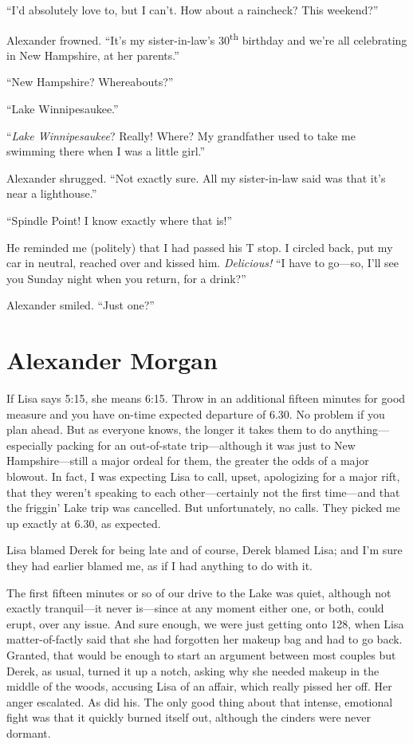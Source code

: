 ``I'd absolutely love to, but I can't. How about a raincheck? This
weekend?''

Alexander frowned. ``It's my sister-in-law's 30\textsuperscript{th}
birthday and we're all celebrating in New Hampshire, at her parents.''

``New Hampshire? Whereabouts?''

``Lake Winnipesaukee.''

``\emph{Lake Winnipesaukee}? Really! Where? My grandfather used to take
me swimming there when I was a little girl.''

Alexander shrugged. ``Not exactly sure. All my sister-in-law said was
that it's near a lighthouse.''

``Spindle Point! I know exactly where that is!''

He reminded me (politely) that I had passed his T stop. I circled back,
put my car in neutral, reached over and kissed him. \emph{Delicious!}
``I have to go---so, I'll see you Sunday night when you return, for a
drink?''

Alexander smiled. ``Just one?''

\chapter{Alexander Morgan}

\titlemark

If Lisa says 5:15, she means 6:15. Throw in an additional fifteen
minutes for good measure and you have on-time expected departure of
6.30. No problem if you plan ahead. But as everyone knows, the longer it
takes them to do anything---especially packing for an out-of-state
trip---although it was just to New Hampshire---still a major ordeal for
them, the greater the odds of a major blowout. In fact, I was expecting
Lisa to call, upset, apologizing for a major rift, that they weren't
speaking to each other---certainly not the first time---and that the
friggin' Lake trip was cancelled. But unfortunately, no calls. They
picked me up exactly at 6.30, as expected.

Lisa blamed Derek for being late and of course, Derek blamed Lisa; and
I'm sure they had earlier blamed me, as if I had anything to do with it.

The first fifteen minutes or so of our drive to the Lake was quiet,
although not exactly tranquil---it never is---since at any moment either
one, or both, could erupt, over any issue. And sure enough, we were just
getting onto 128, when Lisa matter-of-factly said that she had forgotten
her makeup bag and had to go back. Granted, that would be enough to
start an argument between most couples but Derek, as usual, turned it up
a notch, asking why she needed makeup in the middle of the woods,
accusing Lisa of an affair, which really pissed her off. Her anger
escalated. As did his. The only good thing about that intense, emotional
fight was that it quickly burned itself out, although the cinders were
never dormant.

